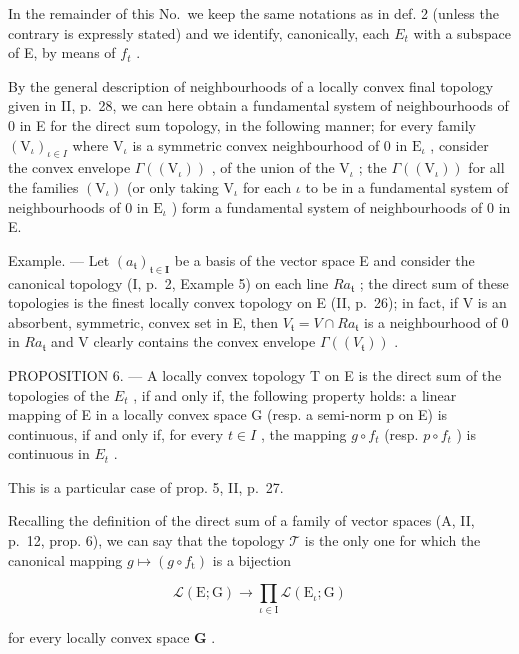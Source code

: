 In the remainder of this No.~we keep the same notations as in def. 2 (unless the contrary is expressly stated) and we identify, canonically, each \(E_{t}\) with a subspace of E, by means of \(f_{t}\) .

By the general description of neighbourhoods of a locally convex final topology given in II, p.~28, we can here obtain a fundamental system of neighbourhoods of 0 in E for the direct sum topology, in the following manner; for every family \((\mathrm{V}_{\iota})_{\iota \in I}\) where \(\mathrm{V}_{\iota}\) is a symmetric convex neighbourhood of 0 in \(\mathrm{E}_{\iota}\) , consider the convex envelope \(\Gamma((\mathrm{V}_{\iota}))\) , of the union of the \(\mathrm{V}_{\iota}\) ; the \(\Gamma((\mathrm{V}_{\iota}))\) for all the families \((\mathrm{V}_{\iota})\) (or only taking \(\mathrm{V}_{\iota}\) for each \(\iota\) to be in a fundamental system of neighbourhoods of 0 in \(\mathrm{E}_{\iota}\) ) form a fundamental system of neighbourhoods of 0 in E.

Example. --- Let \((a_{\mathfrak{t}})_{\mathfrak{t}\in\mathbf{I}}\) be a basis of the vector space E and consider the canonical topology (I, p.~2, Example 5) on each line \(Ra_{\mathfrak{t}}\) ; the direct sum of these topologies is the finest locally convex topology on E (II, p.~26); in fact, if V is an absorbent, symmetric, convex set in E, then \(V_{\mathfrak{t}} = V \cap Ra_{\mathfrak{t}}\) is a neighbourhood of 0 in \(Ra_{\mathfrak{t}}\) and V clearly contains the convex envelope \(\Gamma((V_{\mathfrak{t}}))\) .

PROPOSITION 6. --- A locally convex topology T on E is the direct sum of the topologies of the \(E_{t}\) , if and only if, the following property holds: a linear mapping of E in a locally convex space G (resp. a semi-norm p on E) is continuous, if and only if, for every \(t \in I\) , the mapping \(g \circ f_{t}\) (resp. \(p \circ f_{t}\) ) is continuous in \(E_{t}\) .

This is a particular case of prop. 5, II, p.~27.

Recalling the definition of the direct sum of a family of vector spaces (A, II, p.~12, prop. 6), we can say that the topology \(\mathcal{T}\) is the only one for which the canonical mapping \(g \mapsto (g \circ f_{\mathrm{t}})\) is a bijection

\[
\mathcal {L} (\mathrm{E}; \mathrm{G}) \rightarrow \prod_ {\iota \in \mathrm{I}} \mathcal {L} (\mathrm{E} _ {\iota}; \mathrm{G})\tag{1}
\]

for every locally convex space \(\mathbf{G}\) .

